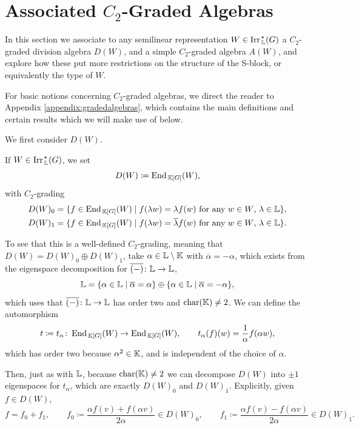 \section{Associated $C_2$-Graded Algebras}\label{sect:BrauerWall}

In this section we associate to any semilinear representation $W \in \operatorname{Irr}_{\, {\mathbb L}}^{\hspace{0.1em} \star}(G)$ a $C_2$-graded division algebra $D(W)$, and a simple $C_2$-graded algebra $A(W)$, and explore how these put more restrictions on the structure of the S-block, or equivalently the type of $W$.

For basic notions concerning $C_2$-graded algebras, we direct the reader to Appendix \ref{appendix:gradedalgebras}, which contains the main definitions and certain results which we will make use of below.

We first consider $D(W)$.

\begin{defn}
If $W \in \operatorname{Irr}_{\, {\mathbb L}}^{\hspace{0.1em} \star}(G)$, we set
\[
D(W) \coloneqq \operatorname{End}_{\, {\mathbb K}[G]}(W),
\]
with $C_2$-grading
\begin{align*}
D(W)_0 &= \{f \in \operatorname{End}_{\, {\mathbb K}[G]}(W) \mid f(\lambda w) = \lambda f(w) \text{ for any $w \in W$, $\lambda \in {\mathbb L}$} \}, \\
D(W)_1 &= \{f \in \operatorname{End}_{\, {\mathbb K}[G]}(W) \mid f(\lambda w) = \overline{\lambda} f(w) \text{ for any $w \in W$, $\lambda \in {\mathbb L}$}\}.
\end{align*}
\end{defn}

To see that this is a well-defined $C_2$-grading, meaning that $D(W) = D(W)_0 \oplus D(W)_1$, take $\alpha \in {\mathbb L} \setminus {\mathbb K}$ with $\overline{\alpha} = - \alpha$, which exists from the eigenspace decomposition for $\overline{(-)} \colon {\mathbb L} \rightarrow {\mathbb L}$,
\[
{\mathbb L} = \{\alpha \in {\mathbb L} \mid \overline{\alpha} = \alpha\} \oplus \{\alpha \in {\mathbb L} \mid \overline{\alpha} = -\alpha\},
\]
which uses that $\overline{(-)} \colon {\mathbb L} \rightarrow {\mathbb L}$ has order two and $\operatorname{char}({\mathbb K}) \neq 2$. We can define the automorphism
\[
t \coloneqq t_{\alpha} \colon \operatorname{End}_{\, {\mathbb K}[G]}(W) \rightarrow \operatorname{End}_{\, {\mathbb K}[G]}(W), \qquad t_{\alpha}(f)(w) = \frac{1}{\alpha} f(\alpha w),
\]
which has order two because $\alpha^2 \in {\mathbb K}$, and is independent of the choice of $\alpha$.

Then, just as with ${\mathbb L}$, because $\operatorname{char}({\mathbb K}) \neq 2$ we can decompose $D(W)$ into $\pm 1$ eigenspaces for $t_{\alpha}$, which are exactly $D(W)_0$ and $D(W)_1$. Explicitly, given $f \in D(W)$,
\[
f = f_0 + f_1, \qquad f_0 \coloneqq \frac{\alpha f(v) + f(\alpha v)}{2 \alpha} \in D(W)_0, \qquad f_1 \coloneqq \frac{\alpha f(v) - f(\alpha v)}{2 \alpha} \in D(W)_1.
\]

